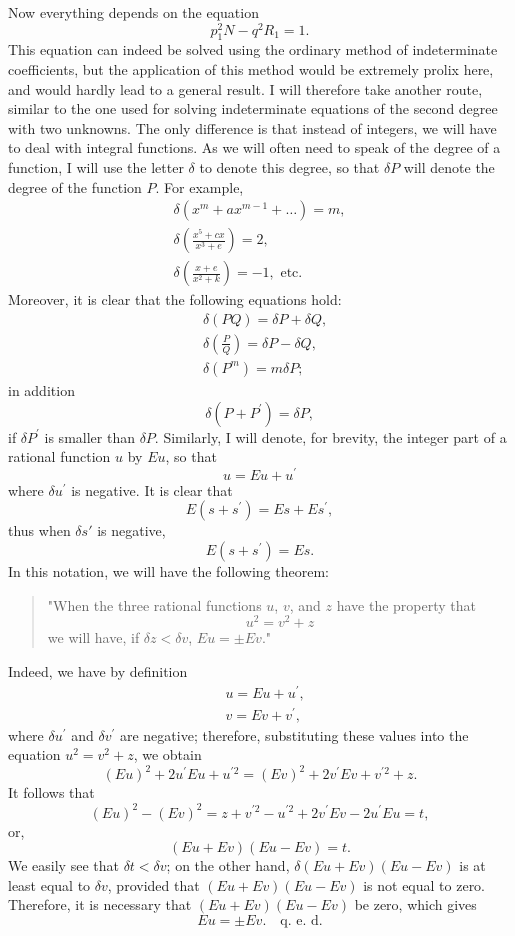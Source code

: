\documentclass[oneside, 12 pt, leqno]{memoir}
\begin{document}
Now everything depends on the equation
\[\tag{7} p_1^2 N-q^2 R_1=1.\]
This equation can indeed be solved using the ordinary method of indeterminate coefficients, but the application of this method would be extremely prolix here, and would hardly lead to a general result. I will therefore take another route, similar to the one used for solving indeterminate equations of the second degree with two unknowns. The only difference is that instead of integers, we will have to deal with integral functions. As we will often need to speak of the degree of a function, I will use the letter \(\delta\) to denote this degree, so that \(\delta P\) will denote the degree of the function \(P\).  For example,
\[\begin{gathered}
\delta\left(x^m+a x^{m-1}+\dots\right)=m, \\
\delta\left(\frac{x^5+c x}{x^3+e}\right)=2, \\
\delta\left(\frac{x+e}{x^2+k}\right)=-1, \text{ etc. }
\end{gathered}\]
Moreover, it is clear that the following equations hold:
\[\begin{aligned}
& \delta(P Q)=\delta P+\delta Q, \\
& \delta\left(\frac{P}{Q}\right)=\delta P-\delta Q, \\
& \delta\left(P^m\right)=m \delta P ;
\end{aligned}\]
in addition
\[\delta\left(P+P^{\prime}\right)=\delta P,\]
if \(\delta P^{\prime}\) is smaller than \(\delta P\). Similarly, I will denote, for brevity, the integer part of a rational function \(u\) by \(E u\), so that
\[u=E u+u^{\prime}\]
where \(\delta u^{\prime}\) is negative. It is clear that
\[E\left(s+s^{\prime}\right)=E s+E s^{\prime},\]
thus when \(\delta s'\) is negative,
\[E\left(s+s^{\prime}\right)=E s.\]
In this notation, we will have the following theorem:

\begin{quote}"When the three rational functions \(u\), \(v\), and \(z\) have the property that
\[u^2=v^2+z\]
we will have, if \(\delta z<\delta v\), \(E u= \pm E v\)."
\end{quote}

Indeed, we have by definition
\[\begin{aligned}
& u=E u+u^{\prime}, \\
& v=E v+v^{\prime},
\end{aligned}\]
where \(\delta u^{\prime}\) and \(\delta v^{\prime}\) are negative; therefore, substituting these values into the equation \(u^2=v^2+z\), we obtain
\[(E u)^2+2 u^{\prime} E u+u^{\prime 2}=(E v)^2+2 v^{\prime} E v+v^{\prime 2}+z.\]
It follows that
\[(E u)^2-(E v)^2=z+v^{\prime 2}-u^{\prime 2}+2 v^{\prime} E v-2 u^{\prime} E u=t,\]
or,
\[(E u+E v)(E u-E v)=t.\]
We easily see that \(\delta t<\delta v\); on the other hand, \(\delta(E u+E v)(E u-E v)\) is at least equal to \(\delta v\), provided that \((E u+E v)(E u-E v)\) is not equal to zero. Therefore, it is necessary that \((E u+E v)(E u-E v)\) be zero, which gives
\[E u= \pm E v. \quad \text {q. e. d.}\]
\end{document}

